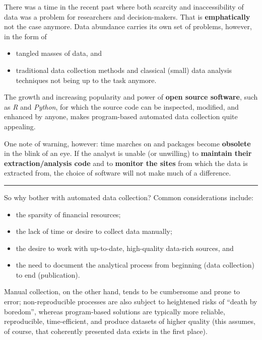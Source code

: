 There was a time in the recent past where both scarcity and inaccessibility of data was a problem for researchers and decision-makers. That is \textbf{emphatically} not the case anymore. 
\newl Data abundance carries its own set of problems, however, in the form of 
\begin{itemize}[noitemsep]
\item tangled masses of data, and 
\item traditional data collection methods and classical (small) data analysis techniques not being up to the task anymore. 
\end{itemize}
The growth and increasing popularity and power of \textbf{open source software}, such as \textit{R} and \textit{Python}, for which the source code can be inspected, modified, and enhanced by anyone, makes program-based automated data collection quite appealing. 

One note of warning, however: time marches on and packages become \textbf{obsolete} in the blink of an eye. If the analyst is unable (or unwilling) to \textbf{maintain their extraction/analysis code} and to \textbf{monitor the sites} from which the data is extracted from, the choice of software will not make much of a difference. 
\begin{center}
    \rule{0.5\textwidth}{.4pt}
\end{center}
So why bother with automated data collection? Common considerations include:
\begin{itemize}[noitemsep]
    \item the sparsity of financial resources;
\item the lack of time or desire to collect data manually;
\item the desire to work with up-to-date, high-quality data-rich sources, and
\item the need to document the analytical process from beginning (data collection) to end (publication).
\end{itemize} 
Manual collection, on the other hand, tends to be cumbersome and prone to error; non-reprodu\-ci\-ble processes are also subject to heightened risks of ``death by boredom'', whereas program-based solutions are typically more reliable, reproducible, time-efficient, and produce datasets of higher quality (this assumes, of course, that coherently presented data exists in the first place).  

